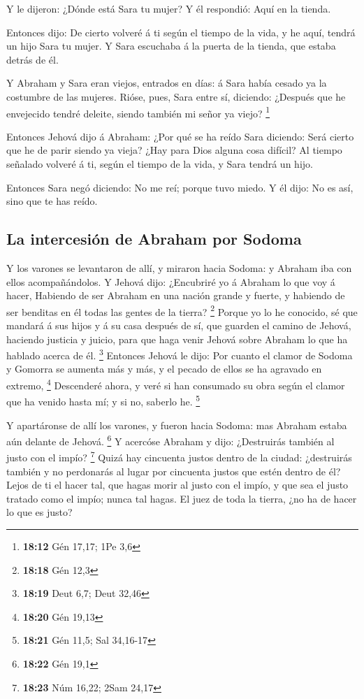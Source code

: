  Y le dijeron: ¿Dónde está Sara tu mujer? Y él respondió:
Aquí en la tienda.

 Entonces dijo: De cierto volveré á ti según el tiempo de
la vida, y he aquí, tendrá un hijo Sara tu mujer. Y Sara escuchaba á la
puerta de la tienda, que estaba detrás de él.

 Y Abraham y Sara eran viejos, entrados en días: á Sara
había cesado ya la costumbre de las mujeres.  Rióse, pues,
Sara entre sí, diciendo: ¿Después que he envejecido tendré deleite,
siendo también mi señor ya viejo? \footnote{\textbf{18:12} Gén 17,17;
  1Pe 3,6}

 Entonces Jehová dijo á Abraham: ¿Por qué se ha reído Sara
diciendo: Será cierto que he de parir siendo ya vieja? 
¿Hay para Dios alguna cosa difícil? Al tiempo señalado volveré á ti,
según el tiempo de la vida, y Sara tendrá un hijo.

 Entonces Sara negó diciendo: No me reí; porque tuvo miedo.
Y él dijo: No es así, sino que te has reído.

\hypertarget{la-intercesiuxf3n-de-abraham-por-sodoma}{%
\subsection{La intercesión de Abraham por
Sodoma}\label{la-intercesiuxf3n-de-abraham-por-sodoma}}

 Y los varones se levantaron de allí, y miraron hacia
Sodoma: y Abraham iba con ellos acompañándolos.  Y Jehová
dijo: ¿Encubriré yo á Abraham lo que voy á hacer,  Habiendo
de ser Abraham en una nación grande y fuerte, y habiendo de ser benditas
en él todas las gentes de la tierra? \footnote{\textbf{18:18} Gén 12,3}
 Porque yo lo he conocido, sé que mandará á sus hijos y á
su casa después de sí, que guarden el camino de Jehová, haciendo
justicia y juicio, para que haga venir Jehová sobre Abraham lo que ha
hablado acerca de él. \footnote{\textbf{18:19} Deut 6,7; Deut 32,46}
 Entonces Jehová le dijo: Por cuanto el clamor de Sodoma y
Gomorra se aumenta más y más, y el pecado de ellos se ha agravado en
extremo, \footnote{\textbf{18:20} Gén 19,13}  Descenderé
ahora, y veré si han consumado su obra según el clamor que ha venido
hasta mí; y si no, saberlo he. \footnote{\textbf{18:21} Gén 11,5; Sal
  34,16-17}

 Y apartáronse de allí los varones, y fueron hacia Sodoma:
mas Abraham estaba aún delante de Jehová. \footnote{\textbf{18:22} Gén
  19,1}  Y acercóse Abraham y dijo: ¿Destruirás también al
justo con el impío? \footnote{\textbf{18:23} Núm 16,22; 2Sam 24,17}
 Quizá hay cincuenta justos dentro de la ciudad:
¿destruirás también y no perdonarás al lugar por cincuenta justos que
estén dentro de él?  Lejos de ti el hacer tal, que hagas
morir al justo con el impío, y que sea el justo tratado como el impío;
nunca tal hagas. El juez de toda la tierra, ¿no ha de hacer lo que es
justo?

